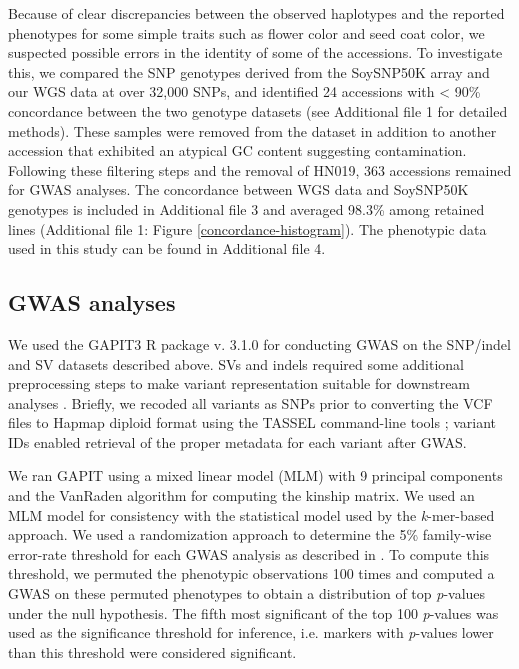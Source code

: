 Because of clear discrepancies between the observed haplotypes and the reported
phenotypes for some simple traits such as flower color and seed coat color, we
suspected possible errors in the identity of some of the accessions. To
investigate this, we compared the SNP genotypes derived from the SoySNP50K
array and our WGS data at over 32,000 SNPs, and identified 24 accessions with <
90\% concordance between the two genotype datasets (see Additional file 1 for
detailed methods). These samples were removed from the dataset in addition to another
accession that exhibited an atypical GC content suggesting contamination.
Following these filtering steps and the removal of HN019, 363 accessions
remained for GWAS analyses. The concordance between WGS data and SoySNP50K
genotypes is included in Additional file 3 and averaged 98.3\% among retained
lines (Additional file 1: Figure \ref{concordance-histogram}). The phenotypic data used in this study can be found in Additional file 4.

\subsection*{GWAS analyses}
\label{sv-gwas-gwas-methods}

We used the GAPIT3 R package v. 3.1.0 \citep{wang2021} for conducting GWAS on
the SNP/indel and SV datasets described above. SVs and indels required some additional
preprocessing steps to make variant
representation suitable for downstream analyses \citep{lemay2022gwas}. Briefly, we recoded all
variants as SNPs prior to converting the VCF files to Hapmap diploid format
using the TASSEL command-line tools \citep{bradbury2007}; variant IDs enabled
retrieval of the proper metadata for each variant after GWAS.

We ran GAPIT using a mixed linear model (MLM) with 9 principal components and the VanRaden
algorithm for computing the kinship matrix. We used an MLM model for
consistency with the statistical model used by the \textit{k}-mer-based
approach.  We used a randomization approach to determine the 5\% family-wise
error-rate threshold for each GWAS analysis as described in \cite{voichek2020}.
To compute this threshold, we permuted the phenotypic observations 100 times
and computed a GWAS on these permuted phenotypes to obtain a distribution of
top \emph{p}-values under the null hypothesis. The fifth most significant of
the top 100 \emph{p}-values was used as the significance threshold for
inference, i.e. markers with \emph{p}-values lower than this threshold were
considered significant.

